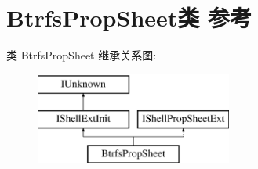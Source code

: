 \hypertarget{class_btrfs_prop_sheet}{}\section{Btrfs\+Prop\+Sheet类 参考}
\label{class_btrfs_prop_sheet}
类 Btrfs\+Prop\+Sheet 继承关系图\+:\begin{figure}[H]
\begin{center}
\leavevmode
\includegraphics[height=3.000000cm]{class_btrfs_prop_sheet}
\end{center}
\end{figure}
